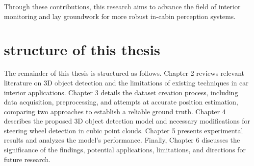 Through these contributions, this research aims to advance the field of 
interior monitoring and lay groundwork for more robust in-cabin perception
systems.

\section{structure of this thesis}
The remainder of this thesis is structured as follows. Chapter 2 reviews 
relevant literature on 3D object detection and the limitations of existing 
techniques in car interior applications. Chapter 3 details the dataset 
creation process, including data acquisition, preprocessing, and attempts 
at accurate position estimation, comparing two approaches to establish a 
reliable ground truth. Chapter 4 describes the proposed 3D object detection 
model and necessary modifications for steering wheel detection in cubic point 
clouds. Chapter 5 presents experimental results and analyzes the model’s performance. 
Finally, Chapter 6 discusses the significance of the findings, potential 
applications, limitations, and directions for future research.




